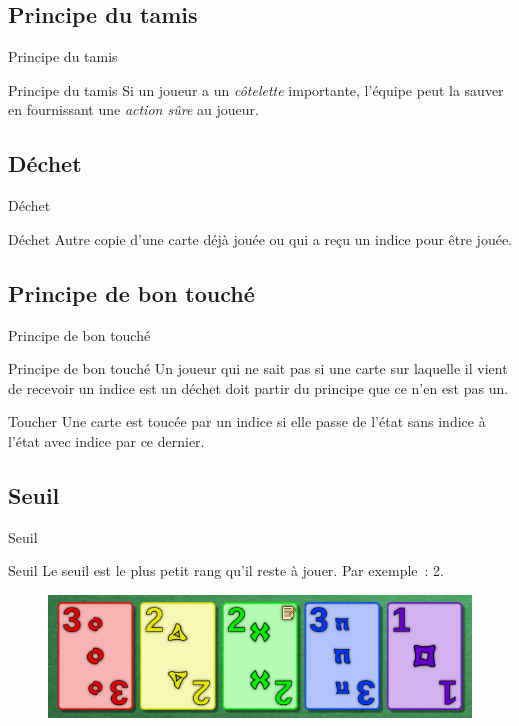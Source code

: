 \documentclass{beamer}
\begin{document}
\subsection{Principe du tamis}
\begin{frame}{Principe du tamis}
    \begin{block}{Principe du tamis}
        Si un joueur a un \emph{côtelette} importante, l'équipe peut la sauver
        en fournissant une \emph{action sûre} au joueur.
    \end{block}
\end{frame}

\subsection{Déchet}
\begin{frame}{Déchet}
    \begin{block}{Déchet}
        Autre copie d'une carte déjà jouée ou qui a reçu un indice pour être
        jouée.
    \end{block}
\end{frame}

\subsection{Principe de bon touché}
\begin{frame}{Principe de bon touché}
    \begin{block}{Principe de bon touché}
        Un joueur qui ne sait pas si une carte sur laquelle il vient de
        recevoir un indice est un déchet doit partir du principe que ce n'en
        est pas un.
    \end{block}
    \begin{block}{Toucher}
        Une carte est toucée par un indice si elle passe de l'état sans indice
        à l'état avec indice par ce dernier.
    \end{block}
\end{frame}

\subsection{Seuil}
\begin{frame}{Seuil}
    \begin{block}{Seuil}
        Le seuil est le plus petit rang qu'il reste à jouer. Par exemple\ : 2.
        \begin{figure}[h]
            \includegraphics[width=\textwidth]{threshold.png}
        \end{figure}
    \end{block}
\end{frame}
\end{document}
